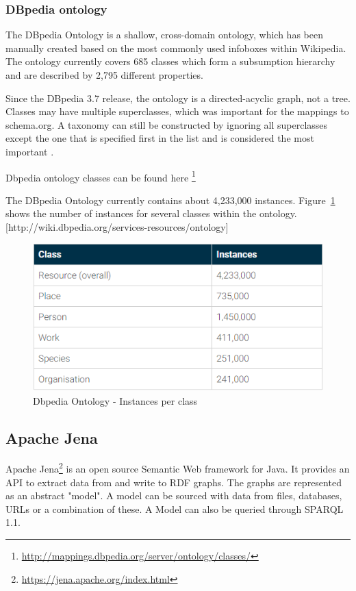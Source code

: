 \documentclass[thesis=M,english]{FITthesis}[2018/05/30]
\begin{document}
\subsubsection{DBpedia ontology}\label{DBpediaOntology}
	The DBpedia Ontology is a shallow, cross-domain ontology, which has been manually created based on the most commonly used infoboxes within Wikipedia. The ontology currently covers 685 classes which form a subsumption hierarchy and are described by 2,795 different properties.

	Since the DBpedia 3.7 release, the ontology is a directed-acyclic graph, not a tree. Classes may have multiple superclasses, which was important for the mappings to schema.org. A taxonomy can still be constructed by ignoring all superclasses except the one that is specified first in the list and is considered the most important \cite{dbpedia:Ontology}. 

Dbpedia ontology classes can be found here \footnote{\url{http://mappings.dbpedia.org/server/ontology/classes/}}

The DBpedia Ontology currently contains about 4,233,000 instances. Figure~\ref{fig:Dbpedia-ontology} shows the number of instances for several classes within the ontology. [http://wiki.dbpedia.org/services-resources/ontology]

	\begin{figure}[H]\centering
		\includegraphics[width=\textwidth]{Dbpedia-ontology}
		\caption{Dbpedia Ontology - Instances per class}\label{fig:Dbpedia-ontology}
	\end{figure}

\subsection{Apache Jena}\label{ApacheJena}
	Apache Jena\footnote{\url{https://jena.apache.org/index.html}} \cite{wiki:ApacheJena} is an open source Semantic Web framework for Java. It provides an API to extract data from and write to RDF graphs. The graphs are represented as an abstract "model". A model can be sourced with data from files, databases, URLs or a combination of these. A Model can also be queried through SPARQL 1.1.
\end{document}
